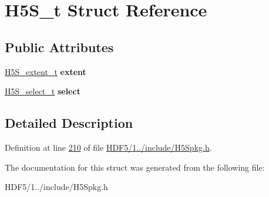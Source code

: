 \hypertarget{struct_h5_s__t}{}\section{H5\+S\+\_\+t Struct Reference}
\label{struct_h5_s__t}
\subsection*{Public Attributes}
\begin{DoxyCompactItemize}
\item 
\mbox{\label{struct_h5_s__t_a68645e5cee47fbcfb80fc327f90ac3e1}} 
\hyperlink{struct_h5_s__extent__t}{H5\+S\+\_\+extent\+\_\+t} {\bfseries extent}
\item 
\mbox{\label{struct_h5_s__t_af7f77bdf9b13f23c6986c7b524a9798f}} 
\hyperlink{struct_h5_s__select__t}{H5\+S\+\_\+select\+\_\+t} {\bfseries select}
\end{DoxyCompactItemize}


\subsection{Detailed Description}


Definition at line \hyperlink{_h_d_f5_21_810_81_2include_2_h5_spkg_8h_source_l00210}{210} of file \hyperlink{_h_d_f5_21_810_81_2include_2_h5_spkg_8h_source}{H\+D\+F5/1../include/\+H5\+Spkg.\+h}.



The documentation for this struct was generated from the following file\+:\begin{DoxyCompactItemize}
\item 
H\+D\+F5/1../include/\+H5\+Spkg.\+h\end{DoxyCompactItemize}
